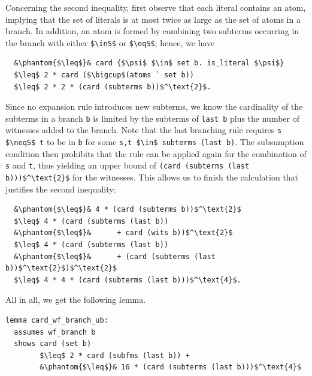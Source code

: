 \documentclass[
  sigplan,
  10pt,
  ]{acmart}
\newcommand{\inS}{\in_\text{s}}
\newcommand{\eqS}{=_\text{s}}
\newcommand{\neqS}{\neq_\text{s}}
\begin{document}
Concerning the second inequality, first observe that each literal contains an atom, implying that the set of literals is at most twice as large as the set of atoms in a branch. 
In addition, an atom is formed by combining two subterms occurring in the branch with either \lstinline!$\inS$! or \lstinline!$\eqS$!;
hence, we have
\begin{lstlisting}
  &\phantom{$\leq$}& card {$\psi$ $\in$ set b. is_literal $\psi$}
  $\leq$ 2 * card ($\bigcup$(atoms ` set b))
  $\leq$ 2 * 2 * (card (subterms b))$^\text{2}$.
\end{lstlisting}
Since no expansion rule introduces new subterms, we know the cardinality of the subterms in a branch \lstinline!b! is limited by the subterms of \lstinline!last b! plus the number of witnesses added to the branch.
Note that the last branching rule requires \lstinline!s $\neqS$ t! to be in \lstinline!b! for some \lstinline!s,t $\in$ subterms (last b)!.
The subsumption condition then prohibits that the rule can be applied again for the combination of \lstinline!s! and \lstinline!t!, thus yielding an upper bound of \lstinline!(card (subterms (last b)))$^\text{2}$! for the witnesses.
This allows us to finish the calculation that justifies the second inequality:
\begin{lstlisting}
  &\phantom{$\leq$}& 4 * (card (subterms b))$^\text{2}$
  $\leq$ 4 * (card (subterms (last b))
  &\phantom{$\leq$}&      + card (wits b))$^\text{2}$
  $\leq$ 4 * (card (subterms (last b))
  &\phantom{$\leq$}&      + (card (subterms (last b))$^\text{2}$)$^\text{2}$
  $\leq$ 4 * 4 * (card (subterms (last b)))$^\text{4}$.
\end{lstlisting}
All in all, we get the following lemma.
\begin{lstlisting}[label={lst:card_branch}]
lemma card_wf_branch_ub:
  assumes wf_branch b
  shows card (set b)
        $\leq$ 2 * card (subfms (last b)) +
        &\phantom{$\leq$}& 16 * (card (subterms (last b)))$^\text{4}$
\end{lstlisting}
\end{document}
